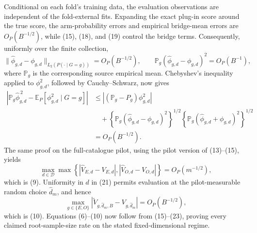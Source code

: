 Conditional on each fold's training data, the evaluation observations are independent of the fold-external fits.  Expanding the exact plug-in score around the true score, the arm-probability errors and empirical bridge-mean errors are \(O_P(B^{-1/2})\), while (15), (18), and (19) control the bridge terms.  Consequently, uniformly over the finite collection,
\[
 \|\widehat\phi_{g,d}-\phi_{g,d}\|_{L_2(P(\cdot\mid G=g))}
 =O_P(B^{-1/2}),
 \qquad
 \mathbb P_g(\widehat\phi_{g,d}-\phi_{g,d})^2=O_P(B^{-1}), \tag{20}
\]
where \(\mathbb P_g\) is the corresponding source empirical mean.  Chebyshev's inequality applied to \(\phi_{g,d}^2\), followed by Cauchy--Schwarz, now gives
\[
\begin{aligned}
 \left|\mathbb P_g\widehat\phi_{g,d}^{\,2}
       -\mathbb E_P\!\left[\phi_{g,d}^2\mid G=g\right]\right|
 &\le
 \left|(\mathbb P_g-P_g)\phi_{g,d}^2\right|\\
 &\quad+
 \left\{\mathbb P_g(\widehat\phi_{g,d}-\phi_{g,d})^2\right\}^{1/2}
 \left\{\mathbb P_g(\widehat\phi_{g,d}+\phi_{g,d})^2\right\}^{1/2}\\
 &=O_P(B^{-1/2}).                                         \tag{21}
\end{aligned}
\]
The same proof on the full-catalogue pilot, using the pilot version of (13)--(15), yields
\[
 \max_{d\in\mathcal D}\max\left\{
 |\widehat V_{E,d}-V_{E,d}|,
 |\widehat V_{O,d}-V_{O,d}|
 \right\}=O_P(m^{-1/2}),                                 \tag{22}
\]
which is (9).  Uniformity in \(d\) in (21) permits evaluation at the pilot-measurable random choice \(\widehat d_m\), and hence
\[
 \max_{g\in\{E,O\}}
 \left|\widetilde V_{g,\widehat d_m,B}-V_{g,\widehat d_m}\right|
 =O_P(B^{-1/2}),                                          \tag{23}
\]
which is (10).  Equations (6)--(10) now follow from (15)--(23), proving every claimed root-sample-size rate on the stated fixed-dimensional regime.